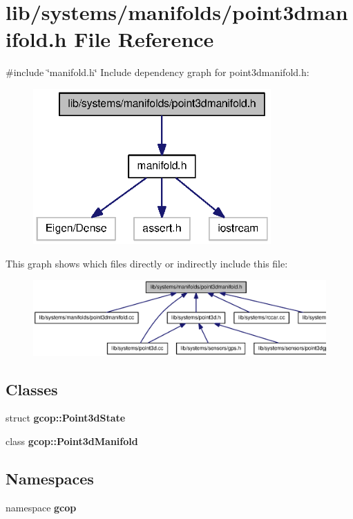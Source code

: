 \section{lib/systems/manifolds/point3dmanifold.h \-File \-Reference}
\label{point3dmanifold_8h}
{\ttfamily \#include \char`\"{}manifold.\-h\char`\"{}}\*
\-Include dependency graph for point3dmanifold.\-h\-:\nopagebreak
\begin{figure}[H]
\begin{center}
\leavevmode
\includegraphics[width=258pt]{point3dmanifold_8h__incl}
\end{center}
\end{figure}
\-This graph shows which files directly or indirectly include this file\-:\nopagebreak
\begin{figure}[H]
\begin{center}
\leavevmode
\includegraphics[width=350pt]{point3dmanifold_8h__dep__incl}
\end{center}
\end{figure}
\subsection*{\-Classes}
\begin{DoxyCompactItemize}
\item 
struct {\bf gcop\-::\-Point3d\-State}
\item 
class {\bf gcop\-::\-Point3d\-Manifold}
\end{DoxyCompactItemize}
\subsection*{\-Namespaces}
\begin{DoxyCompactItemize}
\item 
namespace {\bf gcop}
\end{DoxyCompactItemize}
